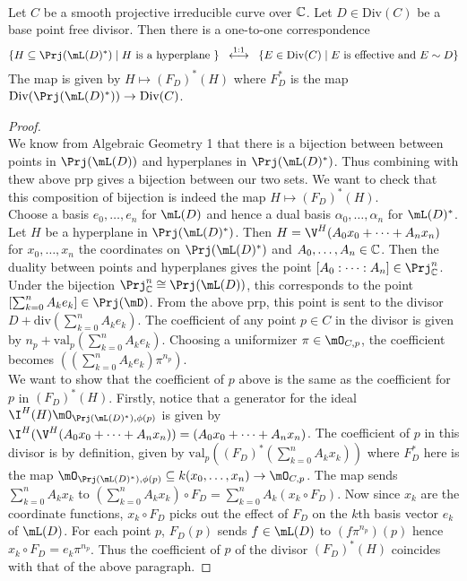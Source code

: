 \documentclass[a4paper]{article}
\begin{document}
\begin{prp}{}{}\\
Let $C$ be a smooth projective irreducible curve over $\mathbb{C}$. Let $D\in\text{Div}(C)$ be a base point free divisor. Then there is a one-to-one correspondence $$\{H\subseteq\Prj(\mL(D)^\ast)\;|\;H\text{ is a hyperplane }\}\;\;\overset{1:1}{\longleftrightarrow}\;\;\{E\in\text{Div}(C)\;|\;E\text{ is effective and }E\sim D\}$$ The map is given by $H\mapsto(F_D)^\ast(H)$ where $F_D^\ast$ is the map $\text{Div}(\Prj(\mL(D)^\ast))\to\text{Div}(C)$. 
\begin{proof}\\
We know from Algebraic Geometry 1 that there is a bijection between between points in $\Prj(\mL(D))$ and hyperplanes in $\Prj(\mL(D)^\ast)$. Thus combining with thew above prp gives a bijection between our two sets. We want to check that this composition of bijection is indeed the map $H\mapsto(F_D)^\ast(H)$. \\

Choose a basis $e_0,\dots,e_n$ for $\mL(D)$ and hence a dual basis $\alpha_0,\dots,\alpha_n$ for $\mL(D)^\ast$. Let $H$ be a hyperplane in $\Prj(\mL(D)^\ast)$. Then $H=\V^H(A_0x_0+\dots+A_nx_n)$ for $x_0,\dots,x_n$ the coordinates on $\Prj(\mL(D)^\ast)$ and $A_0,\dots,A_n\in\mathbb{C}$. Then the duality between points and hyperplanes gives the point $[A_0:\cdots:A_n]\in\Prj_\C^n$. Under the bijection $\Prj_\C^n\cong\Prj(\mL(D))$, this corresponds to the point $\left[\sum_{k=0}^nA_ke_k\right]\in\Prj(\mD)$. From the above prp, this point is sent to the divisor $D+\text{div}\left(\sum_{k=0}^nA_ke_k\right)$. The coefficient of any point $p\in C$ in the divisor is given by $n_p+\text{val}_p\left(\sum_{k=0}^nA_ke_k\right)$. Choosing a uniformizer $\pi\in\mO_{C,p}$, the coefficient becomes $\left(\left(\sum_{k=0}^nA_ke_k\right)\pi^{n_p}\right)$. \\

We want to show that the coefficient of $p$ above is the same as the coefficient for $p$ in $(F_D)^\ast(H)$. Firstly, notice that a generator for the ideal $\I^H(H)\mO_{\Prj(\mL(D)^\ast),\phi(p)}$ is given by $\I^H(\V^H(A_0x_0+\dots+A_nx_n))=(A_0x_0+\dots+A_nx_n)$. The coefficient of $p$ in this divisor is by definition, given by $\text{val}_p\left((F_D)^\ast\left(\sum_{k=0}^nA_kx_k\right)\right)$ where $F_D^\ast$ here is the map $\mO_{\Prj(\mL(D)^\ast),\phi(p)}\subseteq k(x_0,\dots,x_n)\to\mO_{C,p}$. The map sends $\sum_{k=0}^nA_kx_k$ to $\left(\sum_{k=0}^nA_kx_k\right)\circ F_D=\sum_{k=0}^nA_k(x_k\circ F_D)$. Now since $x_k$ are the coordinate functions, $x_k\circ F_D$ picks out the effect of $F_D$ on the $k$th basis vector $e_k$ of $\mL(D)$. For each point $p$, $F_D(p)$ sends $f\in\mL(D)$ to $(f\pi^{n_p})(p)$ hence $x_k\circ F_D=e_k\pi^{n_p}$. Thus the coefficient of $p$ of the divisor $(F_D)^\ast(H)$ coincides with that of the above paragraph. 
\end{proof}
\end{prp}
\end{document}

